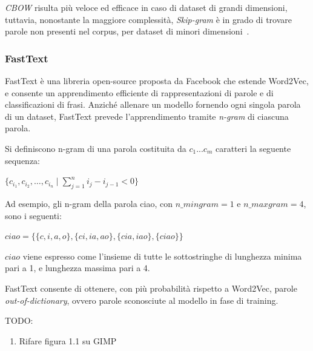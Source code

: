 \emph{CBOW} risulta più veloce ed efficace in caso di dataset di grandi dimensioni, tuttavia, nonostante la maggiore complessità, \emph{Skip-gram} è in grado di trovare parole non presenti nel corpus, per dataset di minori dimensioni~\cite{mikolov2013efficient}.


\subsubsection{FastText}

FastText è una libreria open-source proposta da Facebook che estende Word2Vec, e consente un apprendimento efficiente di rappresentazioni di parole e di classificazioni di frasi.
Anziché allenare un modello fornendo ogni singola parola di un dataset, FastText prevede l'apprendimento tramite \textit{n-gram} di ciascuna parola.

Si definiscono n-gram di una parola costituita da $c_1...c_m$ caratteri la seguente sequenza:
\begin{center}
$\{ c_{i_1}, c_{i_2}, \ldots, c_{i_n} \mid \sum\limits_{j=1}^n i_{j} - i_{j-1} < 0 \}$    
\end{center}
Ad esempio, gli n-gram della parola ciao, con $n\_mingram = 1$ e $n\_maxgram = 4$, sono i seguenti:

\begin{center}
    $ciao = \{\{c, i, a, o\},\{ci, ia, ao\}, \{cia, iao\}, \{ciao\}\}$
\end{center}
$ciao$ viene espresso come l'insieme di tutte le sottostringhe di lunghezza minima pari a 1, e lunghezza massima pari a 4.



FastText consente di ottenere, con più probabilità rispetto a Word2Vec, parole \emph{out-of-dictionary}, ovvero parole sconosciute al modello in fase di training.

TODO:

\begin{enumerate}
    \item Rifare figura 1.1 su GIMP
\end{enumerate}
